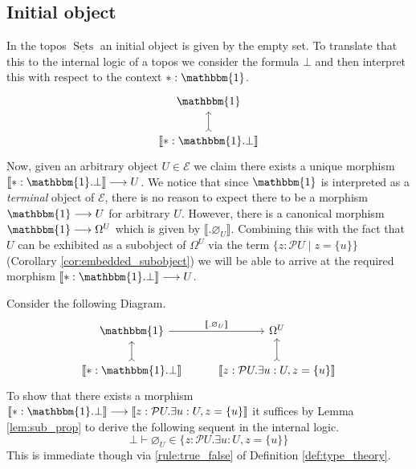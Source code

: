\documentclass{birkjour}
\theoremstyle{plain}
\theoremstyle{definition}
\newcommand{\call}[1]{\mathcal{#1}}
\newcommand{\lto}{\longrightarrow}
\begin{document}
	\subsection{Initial object}\label{sec:initial_object}
	In the topos $\underline{\operatorname{Sets}}$ an initial object is given by the empty set. To translate that this to the internal logic of a topos we consider the formula $\bot$ and then interpret this with respect to the context $\ast: \mathbbm{1}$.
	\begin{equation}
		\begin{tikzcd}
			\mathbbm{1}\\
			\llbracket \ast: \mathbbm{1} . \bot \rrbracket\arrow[u,rightarrowtail]
		\end{tikzcd}
	\end{equation}
	Now, given an arbitrary object $U \in \call{E}$ we claim there exists a unique morphism $\llbracket \ast: \mathbbm{1} . \bot \rrbracket \lto U$. We notice that since $\mathbbm{1}$ is interpreted as a \emph{terminal} object of $\call{E}$, there is no reason to expect there to be a morphism $\mathbbm{1} \lto U$ for arbitrary $U$. However, there is a canonical morphism $\mathbbm{1} \lto \Omega^U$ which is given by $\llbracket . \varnothing_U\rrbracket$. Combining this with the fact that $U$ can be exhibited as a subobject of $\Omega^U$ via the term $\big\lbrace z : \call{P}U \mid z = \lbrace u \rbrace \big\rbrace$ (Corollary \ref{cor:embedded_subobject}) we will be able to arrive at the required morphism $\llbracket \ast: \mathbbm{1} . \bot \rrbracket \lto U$.
	
	Consider the following Diagram.
	\begin{equation}\label{eq:initial_pullback}
		\begin{tikzcd}
			\mathbbm{1}\arrow[r,"{\llbracket . \varnothing_U \rrbracket}"] & \Omega^U\\
			\llbracket \ast: \mathbbm{1} . \bot \rrbracket\arrow[u,rightarrowtail] & \llbracket z: \call{P}U . \exists u:U, z = \lbrace u \rbrace \rrbracket\arrow[u,rightarrowtail]
		\end{tikzcd}
	\end{equation}
	To show that there exists a morphism $\llbracket \ast: \mathbbm{1} . \bot \rrbracket \lto \llbracket z: \call{P}U . \exists u:U, z = \lbrace u \rbrace \rrbracket$ it suffices by Lemma \ref{lem:sub_prop} to derive the following sequent in the internal logic.
	\begin{equation}\label{eq:entailment}
		\bot \vdash \varnothing_U \in \lbrace z: \call{P}U . \exists u:U, z = \lbrace u \rbrace \rbrace
	\end{equation}
	This is immediate though via \ref{rule:true_false} of Definition \ref{def:type_theory}.
	
\end{document}
